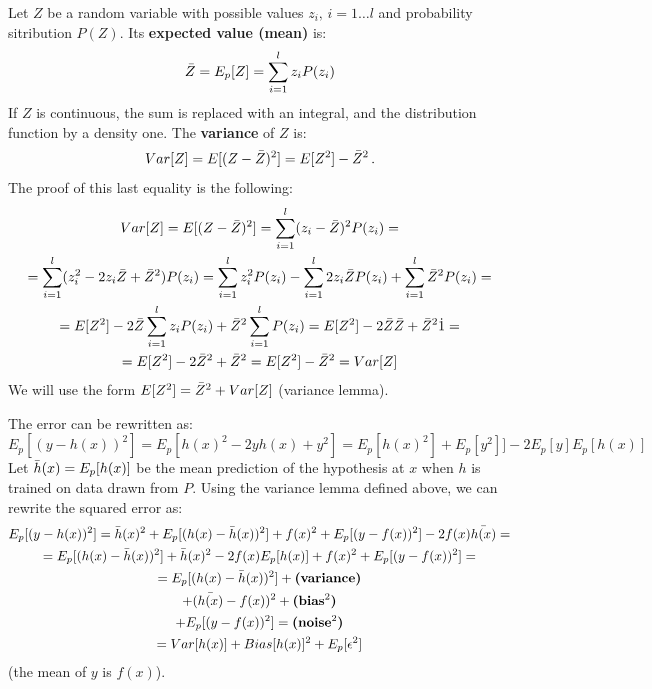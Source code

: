 Let $Z$ be a random variable with possible values $z_i, \, i = 1 \dots l$ and probability sitribution $P(Z)$. Its \textbf{expected value (mean)} is:
\begin{equation*}
    \Bar{Z} = E_p[Z] = \sum_{i=1}^l z_iP(z_i)
\end{equation*}
If $Z$ is continuous, the sum is replaced with an integral, and the distribution function by a density one. The \textbf{variance} of $Z$ is:
\begin{equation*}
    Var[Z] = E[(Z - \Bar{Z})^2] = E[Z^2] - \Bar{Z}^2 \,.
\end{equation*}
The proof of this last equality is the following:
\begin{gather*}
    Var[Z] = E[(Z - \Bar{Z})^2] = \sum_{i=1}^l (z_i - \Bar{Z})^2 P(z_i) = \\
    = \sum_{i=1}^l (z_i^2 - 2 z_i \Bar{Z} + \Bar{Z}^2) P(z_i) = \sum_{i=1}^l z_i^2 P(z_i) - \sum_{i=1}^l 2 z_i \Bar{Z} P(z_i) + \sum_{i=1}^l \Bar{Z}^2 P(z_i) = \\
     = E[Z^2] - 2\Bar{Z} \sum_{i=1}^l z_i P(z_i) + \Bar{Z}^2 \sum_{i=1}^l P(z_i) = E[Z^2] - 2 \Bar{Z} \Bar{Z} + \Bar{Z}^2 \dot 1 = \\
     = E[Z^2] - 2 \Bar{Z}^2 + \Bar{Z}^2 = E[Z^2] - \Bar{Z}^2 = Var[Z]
\end{gather*}
We will use the form $E[Z^2] = \Bar{Z}^2 + Var[Z]$ (variance lemma).

The error can be rewritten as:
\begin{equation*}
    E_p[(y - h(x))^2] = E_p[h(x)^2 - 2yh(x) + y^2] = E_p[h(x)^2] + E_p[y^2]] - 2E_p[y]E_p[h(x)]
\end{equation*}
Let $\Bar{h}(x) = E_p[h(x)]$ be the mean prediction of the hypothesis at $x$ when $h$ is trained on data drawn from $P$. Using the variance lemma defined above, we can rewrite the squared error as:
\begin{gather*}
    E_p[(y - h(x))^2] = \Bar{h}(x)^2 + E_p[(h(x) - \Bar{h}(x))^2] + f(x)^2 + E_p[(y - f(x))^2] - 2f(x)\Bar{h(x)} = \\
    = E_p[(h(x) - \Bar{h}(x))^2] + \Bar{h}(x)^2 - 2f(x)E_p[h(x)] + f(x)^2 + E_p[(y - f(x))^2] = \\
    = E_p[(h(x) - \Bar{h}(x))^2] + \textbf{(variance)}\\
    + (\Bar{h(x)} - f(x))^2 + \textbf{(bias$^2$)} \\
    + E_p[(y - f(x))^2] = \textbf{(noise$^2$)} \\
    = Var[h(x)] + Bias[h(x)]^2 + E_p[\epsilon^2]
\end{gather*}
(the mean of $y$ is $f(x)$).

